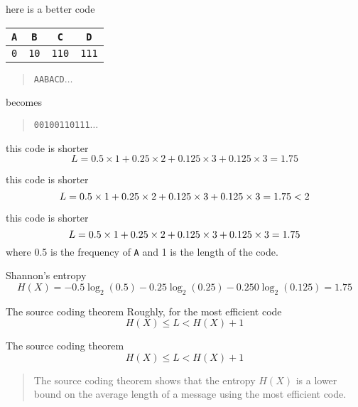\documentclass{beamer}
\newcommand{\crish}{\color{reddish}}
\newcommand{\cbla}{\color{black}}
\newcommand{\cred}{\color{red}}
\newcommand{\cblu}{\color{blue}}
\newcommand{\cgre}{\color{green}}
\newcommand{\letter}[1]{\color{blue}\texttt{#1}\color{black}}
\newcommand{\binary}[1]{\color{red}\texttt{#1}\color{black}}
\begin{document}
\begin{frame}{here is a better code}
\begin{center}
\begin{tabular}{cccc}
\letter{A}&\letter{B}&\letter{C}&\letter{D}\\
\hline
\binary{0}&\binary{10}&\binary{110}&\binary{111}
\end{tabular}
\end{center}
  \begin{quote}
    \letter{AABAC\cgre D\cblu{}}$\ldots$
  \end{quote}
  becomes
    \begin{quote}
    \binary{00100110\cgre 111\cred{}}$\ldots$
    \end{quote}
\end{frame}  

\begin{frame}{this code is shorter}
  \crish
  $$
  L=0.5\times 1 +0.25\times 2 + 0.125\times 3 +
0.125\times 3=1.75
$$
\cbla
\end{frame}


\begin{frame}{this code is shorter}
  \crish
  $$
  L=0.5\times 1 +0.25\times 2 + 0.125\times 3 +
0.125\times 3=\cgre 1.75 < 2
$$
\cbla
\end{frame}


\begin{frame}{this code is shorter}
  \crish
  $$
  L=\cgre 0.5\cbla \times \cred 1\crish +0.25\times 2 + 0.125\times 3 +
0.125\times 3=1.75
$$
\cbla
where \cgre 0.5\cbla{} is the frequency of \letter{A}{} and \cred 1\cbla{} is the length of the code.
\end{frame}


\begin{frame}{Shannon's entropy}
  \crish
  $$
H(X)=-0.5\log_2(0.5)-0.25\log_2(0.25)-0.250\log_2(0.125)=1.75
$$
\cbla
\end{frame}

\begin{frame}{The source coding theorem}
Roughly, for the most efficient code
  \crish
  $$
H(X)\le L < H(X)+1
$$
\cbla
\end{frame}


\begin{frame}{The source coding theorem}
  \crish
  $$
H(X)\le L < H(X)+1
$$
\cbla
\begin{quote}
  The source coding theorem shows that the entropy $H(X)$ is a lower
  bound on the average length of a message using the most efficient
  code.
\end{quote}
\end{frame}
\end{document}
